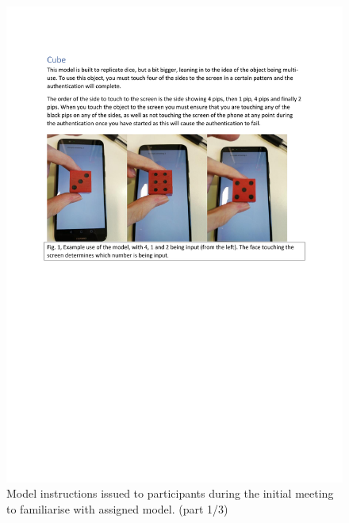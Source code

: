 \documentclass{l4proj}
\begin{document}
\begin{appendices}
\begin{figure}
    \centering
    \includegraphics[page=1,width=\linewidth]{Appendices/Model Instructions.pdf}
    \caption{Model instructions issued to participants during the initial meeting to familiarise with assigned model. (part 1/3)}
    \label{fig:interaction1}
\end{figure}



\end{appendices}
\end{document}

